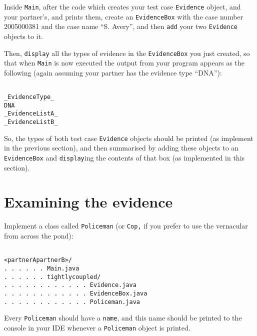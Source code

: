 \documentclass[11pt]{article}
\begin{document}
Inside \texttt{Main}, after the code which creates your test case \texttt{Evidence} object, and your partner's, and prints them, create an \texttt{EvidenceBox} with the case number 2005000381 and the case name ``S. Avery'', and then \texttt{add} your two \texttt{Evidence} objects to it.

Then,  \texttt{display} all the types of evidence in the \texttt{EvidenceBox} you just created, so that when \texttt{Main} is now executed the output from your program appears as the following (again assuming your partner has the evidence type ``DNA''):

\vspace{-8mm}

\begin{verbatim}

_EvidenceType_
DNA
_EvidenceListA_
_EvidenceListB_

\end{verbatim}

\vspace{-8mm}

So, the types of both test case \texttt{Evidence} objects should be printed (as implement in the previous section), and then summarised by adding these objects to an \texttt{EvidenceBox} and \texttt{display}ing the contents of that box (as implemented in this section).

\section{Examining the evidence}

Implement a class called \texttt{Policeman} (or \texttt{Cop,} if you prefer to use the vernacular from across the pond):

\vspace{-8mm}

\begin{verbatim}

<partnerApartnerB>/
. . . . . . Main.java
. . . . . . tightlycoupled/
. . . . . . . . . . . . Evidence.java
. . . . . . . . . . . . EvidenceBox.java
. . . . . . . . . . . . Policeman.java

\end{verbatim}

\vspace{-8mm}

Every \texttt{Policeman} should have a \texttt{name}, and this name should be printed to the console in your IDE whenever a \texttt{Policeman} object is printed.
\end{document}
